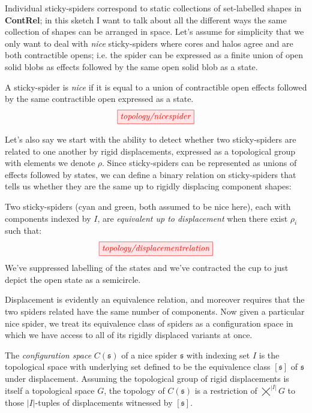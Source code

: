 Individual sticky-spiders correspond to static collections of set-labelled shapes in \textbf{ContRel}; in this sketch I want to talk about all the different ways the same collection of shapes can be arranged in space. Let's assume for simplicity that we only want to deal with \emph{nice} sticky-spiders where cores and halos agree and are both contractible opens; i.e. the spider can be expressed as a finite union of open solid blobs as effects followed by the same open solid blob as a state.

\begin{defn}
A sticky-spider is \emph{nice} if it is equal to a union of contractible open effects followed by the same contractible open expressed as a state.
\[\tikzfig{topology/nicespider}\]
\end{defn}

Let's also say we start with the ability to detect whether two sticky-spiders are related to one another by rigid displacements, expressed as a topological group with elements we denote $\rho$. Since sticky-spiders can be represented as unions of effects followed by states, we can define a binary relation on sticky-spiders that tells us whether they are the same up to rigidly displacing component shapes:

\begin{defn}
Two sticky-spiders (cyan and green, both assumed to be nice here), each with components indexed by $I$, are \emph{equivalent up to displacement} when there exist $\rho_i$ such that:
\[\tikzfig{topology/displacementrelation}\]
We've suppressed labelling of the states and we've contracted the cup to just depict the open state as a semicircle.
\end{defn}

Displacement is evidently an equivalence relation, and moreover requires that the two spiders related have the same number of components. Now given a particular nice spider, we treat its equivalence class of spiders as a configuration space in which we have access to all of its rigidly displaced variants at once.

\begin{defn}\label{defn:configurationspace}
The \emph{configuration space} $C(\mathfrak{s})$ of a nice spider $\mathfrak{s}$ with indexing set $I$ is the topological space with underlying set defined to be the equivalence class $[\mathfrak{s}]$ of $\mathfrak{s}$ under displacement. Assuming the topological group of rigid displacements is itself a topological space $G$, the topology of $C(\mathfrak{s})$ is a restriction of $\bigtimes^{|I|} G$ to those $|I|$-tuples of displacements witnessed by $[\mathfrak{s}]$.
\end{defn}

